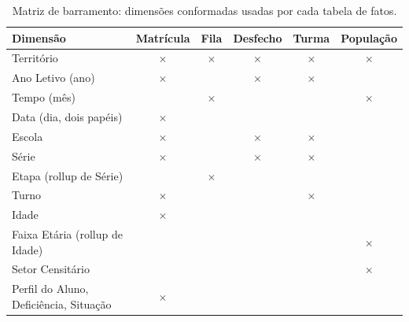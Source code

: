 \documentclass[11pt,a4paper]{article}
\begin{document}
\begin{table}[H]\centering\small
\setlength{\tabcolsep}{4pt}
\begin{tabular}{lccccc}
\toprule
\textbf{Dimensão} & \textbf{Matrícula} & \textbf{Fila} & \textbf{Desfecho} & \textbf{Turma} & \textbf{População}\\\midrule
Território & $\times$ & $\times$ & $\times$ & $\times$ & $\times$ \\
Ano Letivo (ano) & $\times$ & & $\times$ & $\times$ & \\
Tempo (mês) & & $\times$ & & & $\times$ \\
Data (dia, dois papéis) & $\times$ & & & & \\
Escola & $\times$ & & $\times$ & $\times$ & \\
Série & $\times$ & & $\times$ & $\times$ & \\
Etapa (rollup de Série) & & $\times$ & & & \\
Turno & $\times$ & & & $\times$ & \\
Idade & $\times$ & & & & \\
Faixa Etária (rollup de Idade) & & & & & $\times$ \\
Setor Censitário & & & & & $\times$ \\
Perfil do Aluno, Deficiência, Situação & $\times$ & & & & \\
\bottomrule
\end{tabular}
\caption{Matriz de barramento: dimensões conformadas usadas por cada tabela de fatos.}
\end{table}
\end{document}

